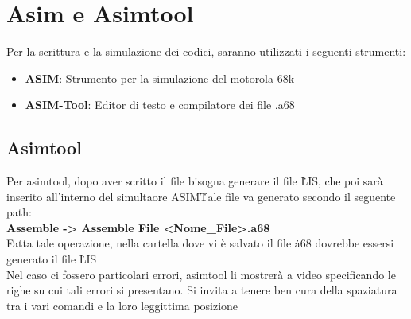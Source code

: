 \section{Asim e Asimtool}\label{par:ASIM}
Per la scrittura e la simulazione dei codici, saranno utilizzati i seguenti strumenti:
\begin{itemize}
    \item \textbf{ASIM}: Strumento per la simulazione del motorola 68k
    \item \textbf{ASIM-Tool}: Editor di testo e compilatore dei file .a68
\end{itemize}

\subsection{Asimtool}

Per asimtool, dopo aver scritto il file bisogna generare il file \.LIS, che poi sarà inserito all'interno del simultaore ASIM\. Tale file va generato secondo il seguente path: 
\\
\textbf{Assemble -> Assemble File <Nome\_File>.a68}
\\
Fatta tale operazione, nella cartella dove vi è salvato il file \.a68 dovrebbe essersi generato il file \.LIS
\\
Nel caso ci fossero particolari errori, asimtool li mostrerà a video specificando le righe su cui tali errori si presentano. Si invita a tenere ben cura della spaziatura tra i vari comandi e la loro leggittima posizione



